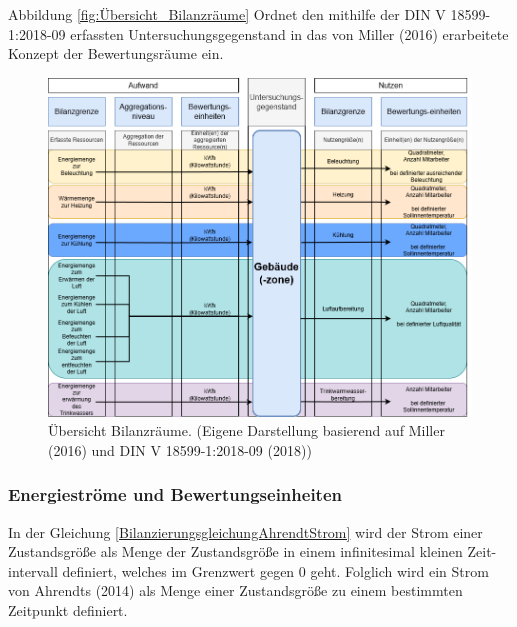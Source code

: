 Abbildung \eqref{fig:Übersicht_Bilanzräume} Ordnet den mithilfe der DIN V 18599-1:2018-09 erfassten Untersuchungsgegenstand in das von Miller (2016) erarbeitete Konzept der 
Bewertungsräume ein.

\begin{figure}[H]
    \centering
    \includegraphics[width=1\textwidth]{../../Ressourcen/Abbildungen/Nutzengröße_Bewertungseinheit.png}
    \caption{Übersicht Bilanzräume. (Eigene Darstellung basierend auf Miller (2016) und DIN V 18599-1:2018-09 (2018))}
    \label{fig:Übersicht_Bilanzräume}
\end{figure}


\subsubsection{Energieströme und Bewertungseinheiten}
In der Gleichung \eqref{BilanzierungsgleichungAhrendtStrom} wird der Strom einer Zustandsgröße als Menge der Zustandsgröße in einem infinitesimal kleinen Zeit-
intervall definiert, welches im Grenzwert gegen 0 geht. Folglich wird ein Strom von Ahrendts (2014) als Menge einer Zustandsgröße zu einem bestimmten Zeitpunkt 
definiert. 

